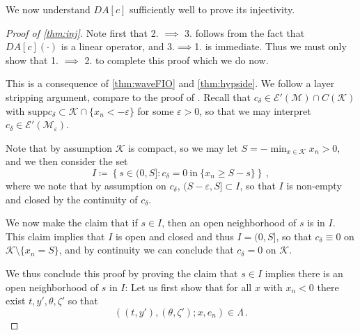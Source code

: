 \documentclass[
	fontsize=11pt, 
	twoside=false, 
	abstract=true, 
	a4paper,
]{scrartcl}
\newcommand{\eps}{\varepsilon}
\newcommand{\supp}{\mathrm{supp}}
\begin{document}
\quad

We now understand $DA[c]$ sufficiently well to prove its injectivity.
\begin{proof}[Proof of \cref{thm:inj}]
	Note first that 2. $\implies$ 3. follows from the fact that $DA[c](\cdot)$ is a linear operator, and 3.$\implies$1. is immediate. Thus we must only show that 1. $\implies$ 2. to complete this proof which we do now.

	This is a consequence of \cref{thm:waveFIO} and \cref{thm:hypside}. %
	We follow a layer stripping argument, compare to the proof of \cite[Thm.~1.4]{2306.05906v1}. 
	Recall that $c_\delta \in \mathcal{E}'(\mathcal{M}) \cap C(\mathcal{K})$ with $\supp c_\delta \subset \mathcal{K} \cap \{x_n < -\eps\}$ for some $\eps>0$, so that we may interpret $c_\delta \in \mathcal{E}'(\mathcal{M}_\eps)$.

	Note that by assumption $\mathcal{K}$ is compact, so we may let $S = -\min_{x \in \mathcal{K}} x_n > 0$, and we then consider the set
	\[
		I \coloneqq \left\{s \in (0,S] \colon c_\delta = 0\ \text{in}\ \{x_n \geq S-s\}\right\}\,,
	\]
	where we note that by assumption on $c_\delta$, $(S-\eps,S]\subset I$, so that $I$ is non-empty and closed by the continuity of $c_\delta$.

	We now make the claim that if $s\in I$, then an open neighborhood of $s$ is in $I$. This claim implies that $I$ is open and closed and thus $I = (0,S]$, so that $c_\delta \equiv 0$ on $\mathcal{K} \setminus \{x_n = S\}$, and by continuity we can conclude that $c_\delta = 0$ on $\mathcal{K}$.

	We thus conclude this proof by proving the claim that $s\in I$ implies there is an open neighborhood of $s$ in $I$: Let us first show that for all $x$ with $x_n < 0$ there exist $t,y',\theta,\zeta'$ so that 
	\[
		((t,y'),(\theta,\zeta');x, e_n) \in \Lambda\,.
	\]


\end{proof}
\end{document}
